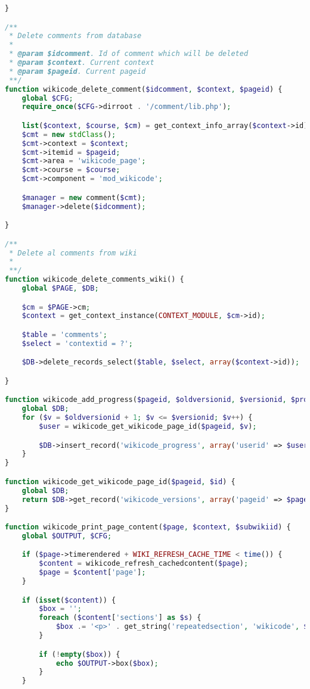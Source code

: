 \begin{lstlisting}[language=PHP]
}

/**
 * Delete comments from database
 *
 * @param $idcomment. Id of comment which will be deleted
 * @param $context. Current context
 * @param $pageid. Current pageid
 **/
function wikicode_delete_comment($idcomment, $context, $pageid) {
    global $CFG;
    require_once($CFG->dirroot . '/comment/lib.php');

    list($context, $course, $cm) = get_context_info_array($context->id);
    $cmt = new stdClass();
    $cmt->context = $context;
    $cmt->itemid = $pageid;
    $cmt->area = 'wikicode_page';
    $cmt->course = $course;
    $cmt->component = 'mod_wikicode';

    $manager = new comment($cmt);
    $manager->delete($idcomment);

}

/**
 * Delete al comments from wiki
 *
 **/
function wikicode_delete_comments_wiki() {
    global $PAGE, $DB;

    $cm = $PAGE->cm;
    $context = get_context_instance(CONTEXT_MODULE, $cm->id);

    $table = 'comments';
    $select = 'contextid = ?';

    $DB->delete_records_select($table, $select, array($context->id));

}

function wikicode_add_progress($pageid, $oldversionid, $versionid, $progress) {
    global $DB;
    for ($v = $oldversionid + 1; $v <= $versionid; $v++) {
        $user = wikicode_get_wikicode_page_id($pageid, $v);

        $DB->insert_record('wikicode_progress', array('userid' => $user->userid, 'pageid' => $pageid, 'versionid' => $v, 'progress' => $progress));
    }
}

function wikicode_get_wikicode_page_id($pageid, $id) {
    global $DB;
    return $DB->get_record('wikicode_versions', array('pageid' => $pageid, 'id' => $id));
}

function wikicode_print_page_content($page, $context, $subwikiid) {
    global $OUTPUT, $CFG;

    if ($page->timerendered + WIKI_REFRESH_CACHE_TIME < time()) {
        $content = wikicode_refresh_cachedcontent($page);
        $page = $content['page'];
    }

    if (isset($content)) {
        $box = '';
        foreach ($content['sections'] as $s) {
            $box .= '<p>' . get_string('repeatedsection', 'wikicode', $s) . '</p>';
        }

        if (!empty($box)) {
            echo $OUTPUT->box($box);
        }
    }


\end{lstlisting}
